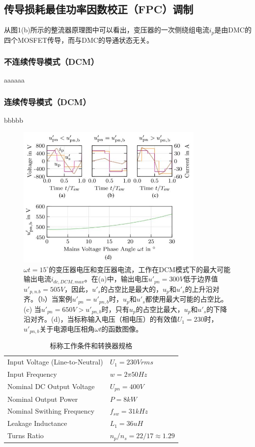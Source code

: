 \documentclass[journal]{IEEEtran}
\begin{document}
\subsection{传导损耗最佳功率因数校正（FPC）调制}

从图1(b)所示的整流器原理图中可以看出，变压器的一次侧绕组电流$i_p$是由DMC的四个MOSFET传导，而与DMC的导通状态无关。

\subsubsection{不连续传导模式（DCM）}

aaaaaa

\subsubsection{连续传导模式（DCM）}

bbbbb


\begin{figure}[h]
\centering
\includegraphics[width=3.6in]{fig7.jpg} %
\caption{$\omega t = 15^\circ$的变压器电压和变压器电流，工作在DCM模式下的最大可能输出电流$i_{dc,DCM,max}$。在(a)中，输出电压$u'_{pn}= 300 V$低于边界值$u'_{p,n.b}= 505 V$，因此，$u'_s$的占空比是最大的，$u_p$和$u'_s$的上升沿对齐。（b）当案例$u'_{pn}= u'_{pn,b}$时，$u_p$和$u'_s$都使用最大可能的占空比。(c) 当$u'_{pn}=650V > u'_{pn,b}$时，只有$u_p$的占空比最大，$u_p$和$u'_s$的下降沿对齐。(d)，当标称输入电压（相电压）的有效值$U_1= 230$时，$u'_{pn,b}$关于电源电压相角$\omega t$的函数图像。}
\label{fig7}
\end{figure}

\begin{table}[h]
\caption{标称工作条件和转换器规格}
\label{table1}
\centering
\begin{tabular}{ll}
\hline
Input Voltage (Line-to-Neutral) & $U_1 = 230 V rms$\\
Input Frequency & $w=2\pi50Hz$\\
Nominal DC Output Voltage & $U_{pn}=400V$\\
Nominal Output Power & $P=8kW$\\
Nominal Swithing Frequency & $f_{sw} = 31 kHz$\\
Leakage Inductance & $L_1=36uH$\\
Turns Ratio & $n_p/n_s = 22/17\approx 1.29$\\
\hline
\end{tabular}
\end{table}
\end{document}
